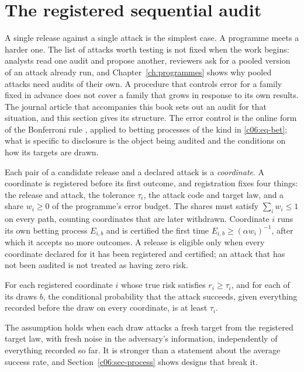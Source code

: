 \section{The registered sequential audit}\label{c06:sec-gate}

A single release against a single attack is the simplest case. A programme meets a
harder one. The list of attacks worth testing is not fixed when the work begins:
analysts read one audit and propose another, reviewers ask for a pooled version of
an attack already run, and Chapter~\ref{ch:programmes} shows why pooled attacks
need audits of their own. A procedure that controls error for a family fixed in
advance does not cover a family that grows in response to its own results. The
journal article that accompanies this book sets out an audit for that situation,
and this section gives its structure. The error control is the online form of the
Bonferroni rule \citep{foster2008,tian2021}, applied to betting processes of the
kind in \eqref{c06:eq-bet}; what is specific to disclosure is the object being
audited and the conditions on how its targets are drawn.

Each pair of a candidate release and a declared attack is a \emph{coordinate}. A
coordinate is registered before its first outcome, and registration fixes four
things: the release and attack, the tolerance $\tau_i$, the attack code and target
law, and a share $w_i \ge 0$ of the programme's error budget. The shares must
satisfy $\sum_i w_i \le 1$ on every path, counting coordinates that are later
withdrawn. Coordinate $i$ runs its own betting process $E_{i,b}$ and is certified the
first time $E_{i,b} \ge (\alpha w_i)^{-1}$, after which it accepts no more
outcomes. A release is eligible only when every coordinate declared for it has been
registered and certified; an attack that has not been audited is not treated as
having zero risk.

\begin{assumption}\label{c06:as-fresh}
For each registered coordinate $i$ whose true risk satisfies $r_i \ge \tau_i$, and
for each of its draws $b$, the conditional probability that the attack succeeds,
given everything recorded before the draw on every coordinate, is at least
$\tau_i$.
\end{assumption}

The assumption holds when each draw attacks a fresh target from the registered
target law, with fresh noise in the adversary's information, independently of
everything recorded so far. It is stronger than a statement about the average
success rate, and Section~\ref{c06:sec-process} shows designs that break it.


